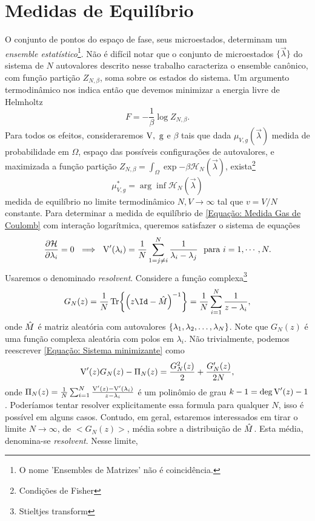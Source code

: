 \section{Medidas de Equilíbrio}
\label{Seção: Medida}
O conjunto de pontos do espaço de fase, seus microestados, determinam um \textit{ensemble estatístico}\footnote{O nome 'Ensembles de Matrizes' não é coincidência.}. Não é difícil notar que o conjunto de microestados $\{\vec{\lambda}\}$ do sistema de $N$ autovalores descrito nesse trabalho caracteriza o ensemble canônico, com função partição $Z_{N, \beta}$, soma sobre os estados do sistema. Um argumento termodinâmico nos indica então que devemos minimizar a energia livre de Helmholtz $$F = -\frac{1}{\beta} \log{Z_{N, \beta}}.$$
Para todos os efeitos, consideraremos $\V, \ \g$ e $\beta$ tais que dada $\mu_{V,g}(\vec{\lambda})$ medida de probabilidade em $\Omega$, espaço das possíveis configurações de autovalores, e maximizada a função partição $Z_{N, \beta} = \int_{\Omega} \exp{-\beta \mathcal{H}_N(\vec{\lambda})}$, exista\footnote{Condições de Fisher} $$\mu_{V,g}^* = \arg \inf {\mathcal{H}_N(\vec{\lambda})}$$ medida de equilíbrio no limite termodinâmico $N, V \rightarrow \infty$ tal que $v = V/N$ constante. Para determinar a medida de equilíbrio \cite{RMT-firstcourse-Potters} de \ref{Equação: Medida Gas de Coulomb} com interação logarítmica, queremos satisfazer o sistema de equações
\begin{equation}
	\frac{\partial \mathcal{H}}{\partial \lambda_i} = 0 \ \implies \ \V'(\lambda_i) = \frac{1}{N} \sum_{1 = j \neq i}^{N} \frac{1}{\lambda_i - \lambda_j} \ \ \text{para} \ i = 1, \cdots, N.
	\label{Equação: Sistema minimizante}
\end{equation} 
Usaremos o denominado \textit{resolvent}. Considere a função complexa\footnote{Stieltjes transform} $$G_N(z) = \frac{1}{N} \Tr{\left(z\Id - \matriz{M}\right)^{-1}} = \frac{1}{N} \sum_{i=1}^{N} \frac{1}{z - \lambda_i},$$ onde $\hat M$ é matriz aleatória com autovalores $\{\lambda_1, \lambda_2, \dots, \lambda_N\}$. Note que $G_N(z)$ é uma função complexa aleatória com polos em $\lambda_i$. Não trivialmente, podemos reescrever \ref{Equação: Sistema minimizante} como $$\operatorname{V}'(z) G_N(z) - \Pi_N(z) = \frac{G_N^2(z)}{2} + \frac{G'_N(z)}{2N},$$ onde $\Pi_N(z) = \frac{1}{N} \sum_{i = 1}^{N} \frac{\operatorname{V}'(z) - \operatorname{V}'(\lambda_i)}{z - \lambda_i}$ é um polinômio de grau $k - 1 = \deg{\operatorname{V}'(z)} - 1$. 
Poderíamos tentar resolver explicitamente essa formula para qualquer $N$, isso é possível em alguns casos. Contudo, em geral, estaremos interessados em tirar o limite $N \to \infty$, de $<G_N(z)>$, média sobre a distribuição de $\hat M$. Esta média, denomina-se \textit{resolvent}. Nesse limite,
